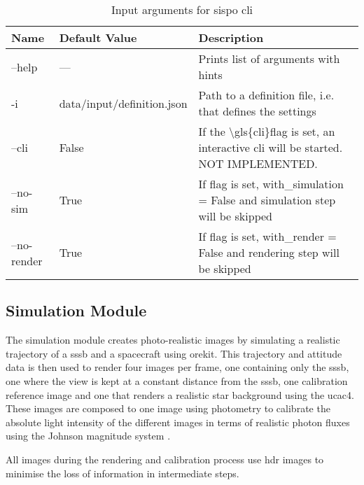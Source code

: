 \begin{table}[htpb]
\caption{Input arguments for sispo \gls{cli}}
\begin{tabular}{lll}
\textbf{Name}                    & \textbf{Default Value}     & \textbf{Description}                                                                                                      \\ \hline
\multicolumn{1}{l|}{--help}      & ---                        & Prints list of arguments with hints                                                                                       \\
\multicolumn{1}{l|}{-i}          & data/input/definition.json & Path to a definition file, i.e. that defines the settings                                                                 \\
\multicolumn{1}{l|}{--cli}       & False                      & If the \textbackslash{}gls\{cli\}flag is set, an interactive \gls{cli} will be started. NOT IMPLEMENTED. \\
\multicolumn{1}{l|}{--no-sim}    & True                       & If flag is set, with\_simulation = False and simulation step will be skipped                                              \\
\multicolumn{1}{l|}{--no-render} & True                       & If flag is set, with\_render = False and rendering step will be skipped                                                  
\end{tabular}
\label{tab:cli_args}
\end{table}

\subsection{Simulation Module}
The simulation module creates photo-realistic images by simulating a realistic trajectory of a \gls{sssb} and a spacecraft using orekit. This trajectory and attitude data is then used to render four images per frame, one containing only the \gls{sssb}, one where the view is kept at a constant distance from the \gls{sssb}, one calibration reference image and one that renders a realistic star background using the \gls{ucac4}. These images are composed to one image using photometry to calibrate the absolute light intensity of the different images in terms of realistic photon fluxes using the Johnson magnitude system \cite{bessel1979ubvri}.

All images during the rendering and calibration process use \gls{hdr} images to minimise the loss of information in intermediate steps.

